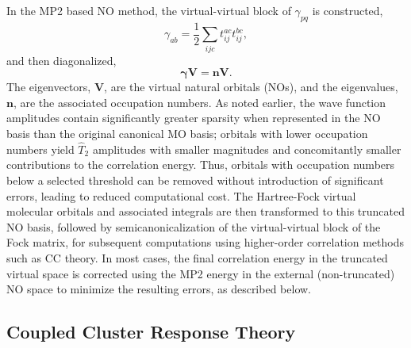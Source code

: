 \documentclass[journal=jpccck,manuscript=article]{achemso}
\begin{document}
In the MP2 based NO method, the virtual-virtual block of $\gamma_{pq}$
is constructed,
\begin{equation}
\gamma_{ab} = \frac{1}{2}\sum_{ijc} t^{ac}_{ij}t^{bc}_{ij},
\label{Eq:dens}
\end{equation}
and then diagonalized,
\begin{equation}
\bm{\gamma} \bm{V} = \bm{n} \bm{V}.
\end{equation}
The eigenvectors, $\bm{V}$, are the virtual natural orbitals (NOs), and the
eigenvalues, $\bm{n}$, are the associated occupation numbers.  As noted
earlier, the wave function amplitudes contain significantly greater sparsity
when represented in the NO basis than the original canonical MO basis;
orbitals with lower occupation numbers yield $\hat{T}_2$ amplitudes with
smaller magnitudes and concomitantly smaller contributions to the correlation
energy.  Thus, orbitals with occupation numbers below a selected threshold can
be removed without introduction of significant errors, leading to reduced
computational cost.  The Hartree-Fock virtual molecular orbitals and
associated integrals are then transformed to this truncated NO basis, followed
by semicanonicalization of the virtual-virtual block of the Fock matrix, for
subsequent computations using higher-order correlation methods such as CC
theory.  In most cases, the final correlation energy in the truncated virtual
space is corrected using the MP2 energy in the external (non-truncated) NO
space to minimize the resulting errors, as described below.

\subsection{Coupled Cluster Response Theory}
\end{document}
